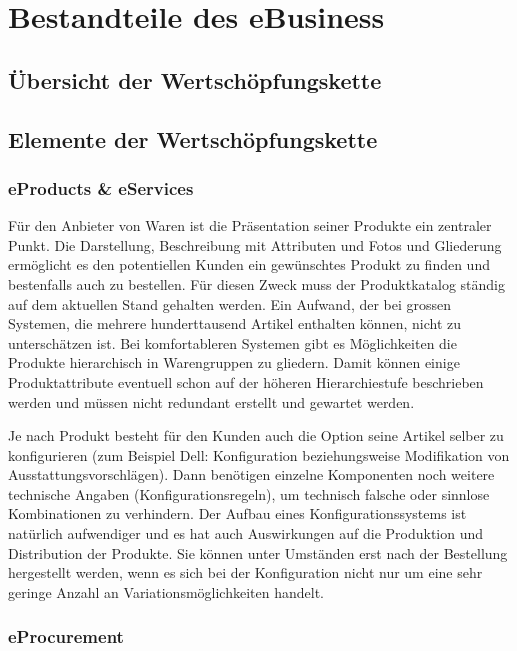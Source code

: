 \section{Bestandteile des eBusiness}

\subsection{Übersicht der Wertschöpfungskette}

\subsection{Elemente der Wertschöpfungskette}

\subsubsection*{eProducts \& eServices}

Für den Anbieter von Waren ist die Präsentation seiner Produkte ein
zentraler Punkt. Die Darstellung, Beschreibung mit Attributen und
Fotos und Gliederung ermöglicht es den potentiellen Kunden ein
gewünschtes Produkt zu finden und bestenfalls auch zu bestellen. Für
diesen Zweck muss der Produktkatalog ständig auf dem aktuellen Stand
gehalten werden. Ein Aufwand, der bei grossen Systemen, die mehrere
hunderttausend Artikel enthalten können, nicht zu unterschätzen ist.
Bei komfortableren Systemen gibt es Möglichkeiten die Produkte hierarchisch
in Warengruppen zu gliedern. Damit können einige Produktattribute eventuell
schon auf der höheren Hierarchiestufe beschrieben werden und müssen
nicht redundant erstellt und gewartet werden.

Je nach Produkt besteht für den Kunden auch die Option seine Artikel
selber zu konfigurieren (zum Beispiel Dell: Konfiguration beziehungsweise
Modifikation von Ausstattungsvorschlägen). Dann benötigen einzelne
Komponenten noch weitere technische Angaben (Konfigurationsregeln), um
technisch falsche oder sinnlose Kombinationen zu verhindern. Der Aufbau
eines Konfigurationssystems ist natürlich aufwendiger und es hat auch
Auswirkungen auf die Produktion und Distribution der Produkte. Sie können
unter Umständen erst nach der Bestellung hergestellt werden, wenn es
sich bei der Konfiguration nicht nur um eine sehr geringe Anzahl an
Variationsmöglichkeiten handelt.

\subsubsection*{eProcurement}

